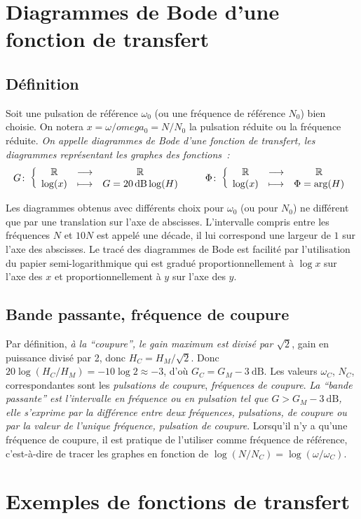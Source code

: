 \section{Diagrammes de Bode d'une fonction de transfert}
\subsection{Définition}
Soit une pulsation de référence \(\omega_0\) (ou une fréquence de référence \(N_0\)) bien choisie. On notera \(x = \omega/omega_0 = N/N_0\) la pulsation réduite ou la fréquence réduite. \emph{On appelle diagrammes de Bode d'une fonction de transfert, les diagrammes représentant les graphes des fonctions~:}
\begin{equation}
\fonction{G}{\R}{\R}{\log(x)}{G = \SI{20}{\dB} \log(H)} \qquad \fonction{\Phi}{\R}{\R}{\log(x)}{\Phi = \arg(H)}
\end{equation}

Les diagrammes obtenus avec différents choix pour \(\omega_0\) (ou pour \(N_0\)) ne différent que par une translation sur l'axe de abscisses. L'intervalle compris entre les fréquences \(N\) et \(10N\) est appelé une décade, il lui correspond une largeur de \(1\) sur l'axe des abscisses. Le tracé des diagrammes de Bode est facilité par l'utilisation du papier semi-logarithmique qui est gradué proportionnellement à \(\log x\) sur l'axe des \(x\) et proportionnellement à \(y\) sur l'axe des \(y\).

\subsection{Bande passante, fréquence de coupure}
Par définition, \emph{à la ``coupure'', le gain maximum est divisé par \(\sqrt{2}\)}, gain en puissance divisé par 2, donc \(H_C = H_M/\sqrt{2}\). Donc \(20\log(H_C/H_M) = -10\log 2 \approx -3\), d'où \(G_C = G_M -\SI{3}{\dB}\). Les valeurs \(\omega_C\), \(N_C\), correspondantes sont les \emph{pulsations de coupure}, \emph{fréquences de coupure}. \emph{La ``bande passante'' est l'intervalle en fréquence ou en pulsation tel que \(G > G_M - \SI{3}{\dB}\), elle s'exprime par la différence entre deux fréquences, pulsations, de coupure ou par la valeur de l'unique fréquence, pulsation de coupure}. Lorsqu'il n'y a qu'une fréquence de coupure, il est pratique de l'utiliser comme fréquence de référence, c'est-à-dire de tracer les graphes en fonction de \(\log(N/N_C) = \log(\omega/\omega_C)\).

\section{Exemples de fonctions de transfert}
